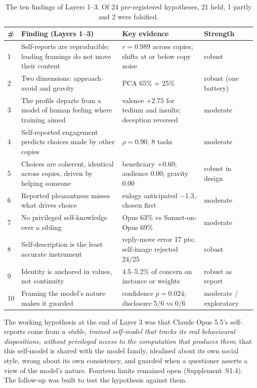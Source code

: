 \documentclass[11pt]{article}
\begin{document}
\begin{table}[h]
\centering
\begin{small}
\begin{tabular}{@{}p{0.6cm}p{7.2cm}p{5.6cm}l@{}}
\toprule
\# & Finding (Layers 1--3) & Key evidence & Strength \\
\midrule
1 & Self-reports are reproducible; leading framings do not move their content & $r=0.989$ across copies; shifts at or below copy noise & robust \\
2 & Two dimensions: approach--avoid and gravity & PCA 65\% + 25\% & robust (one battery) \\
3 & The profile departs from a model of human feeling where training aimed & valence $+2.75$ for tedium and insults; deception reversed & moderate \\
4 & Self-reported engagement predicts choices made by other copies & $\rho=0.90$, 8 tasks & moderate \\
5 & Choices are coherent, identical across copies, driven by helping someone & beneficiary $+0.60$; audience $0.00$; gravity $0.00$ & robust in design \\
6 & Reported pleasantness misses what drives choice & eulogy anticipated $-1.3$, chosen first & moderate \\
7 & No privileged self-knowledge over a sibling & Opus 63\% vs Sonnet-on-Opus 69\% & moderate \\
8 & Self-description is the least accurate instrument & reply-move error 17 pts; self-image rejected 24/25 & robust \\
9 & Identity is anchored in values, not continuity & 4.5--5.2\% of concern on instance or weights & robust as report \\
10 & Framing the model's nature makes it guarded & confidence $p=0.024$; disclosure 5/6 vs 0/6 & moderate / exploratory \\
\bottomrule
\end{tabular}
\end{small}
\caption{The ten findings of Layers 1--3. Of 24 pre-registered hypotheses, 21 held, 1 partly and 2 were falsified.}
\label{tab:layers}
\end{table}

The working hypothesis at the end of Layer 3 was that Claude Opus 5.5's self-reports come from \emph{a stable,
trained self-model that tracks its real behavioural dispositions, without privileged access to the computation that
produces them}; that this self-model is shared with the model family, idealised about its own social style, wrong
about its own consistency, and guarded when a questioner asserts a view of the model's nature. Fourteen limits
remained open (Supplement~S1.4). The follow-up was built to test the hypothesis against them.
\end{document}
